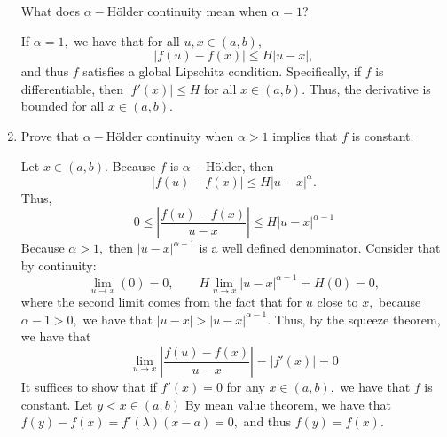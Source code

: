 \documentclass[11pt]{article}
\begin{document}
\begin{enumerate}
    \begin{problem}
        What does $\alpha-$H\"{o}lder continuity mean when $\alpha =1$?
    \end{problem}
    \begin{solution}
        If $\alpha = 1,$ we have that for all $u,x\in (a,b),$
        \[|f(u) - f(x)|\leq H|u-x|,\] and thus $f$ satisfies a global Lipschitz condition. Specifically, if $f$ is differentiable, then $|f'(x)|\leq H$ for all $x\in (a,b).$ Thus, the derivative is bounded for all $x\in (a,b)$.  
    \end{solution} 
    \item 
    \begin{problem}
        Prove that $\alpha-$H\"{o}lder continuity when $\alpha>1$ implies that $f$ is constant.
    \end{problem}
    \begin{solution}
        Let $x\in (a,b).$ Because $f$ is $\alpha-$H\"{o}lder, then 
        \[|f(u) - f(x)|\leq H |u-x|^\alpha.\] Thus, 
        \[0\leq \left|\frac{f(u) - f(x)}{u-x}\right|\leq H |u-x|^{\alpha - 1}\]
        Because $\alpha >1,$ then $|u-x|^{\alpha -1}$ is a well defined denominator. Consider that by continuity:
        \[\lim_{u\to x} (0) = 0,\qquad H\lim_{u\to x}|u-x|^{\alpha -1} = H(0) = 0,\] where the second limit comes from the fact that for $u$ close to $x,$ because $\alpha -1>0,$ we have that $|u-x|>|u-x|^{\alpha-1}.$ Thus, by the squeeze theorem, we have that 
        \[\lim_{u\to x}\left | \frac{f(u) - f(x)}{u-x}\right | =|f'(x)| =  0\] 
        It suffices to show that if $f'(x) = 0$ for any $x\in (a,b),$ we have that $f$ is constant. Let $y<x\in (a,b)$  By mean value theorem, we have that $f(y) - f(x) = f'(\lambda)(x-a) = 0,$ and thus $f(y)= f(x).$ 
    \end{solution}
\end{enumerate}

\newpage
\end{document}
